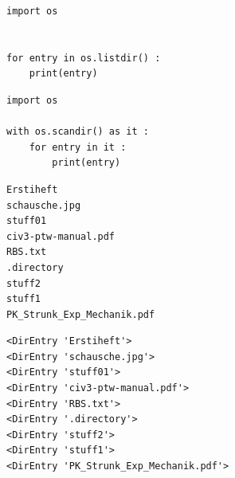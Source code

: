 \begin{frame}[fragile]
%
\begin{tcbraster}[raster columns=2,
                  raster equal height,
                  nobeforeafter,
                  raster column skip=0.5cm]
\begin{codebox}
\begin{verbatim}
import os


for entry in os.listdir() :
    print(entry)
\end{verbatim}
\end{codebox}
%
\begin{codebox}
\begin{verbatim}
import os

with os.scandir() as it :
    for entry in it :
        print(entry)
        \end{verbatim}
\end{codebox}
\end{tcbraster}
%
\begin{tcbraster}[raster columns=2,
                  raster equal height,
                  nobeforeafter,
                  raster column skip=0.5cm]
\begin{cmdbox}
\begin{verbatim}
Erstiheft
schausche.jpg
stuff01
civ3-ptw-manual.pdf
RBS.txt
.directory
stuff2
stuff1
PK_Strunk_Exp_Mechanik.pdf
\end{verbatim}
\end{cmdbox}
%
\begin{cmdbox}
\begin{verbatim}
<DirEntry 'Erstiheft'>
<DirEntry 'schausche.jpg'>
<DirEntry 'stuff01'>
<DirEntry 'civ3-ptw-manual.pdf'>
<DirEntry 'RBS.txt'>
<DirEntry '.directory'>
<DirEntry 'stuff2'>
<DirEntry 'stuff1'>
<DirEntry 'PK_Strunk_Exp_Mechanik.pdf'>
\end{verbatim}
\end{cmdbox}
\end{tcbraster}
%
\end{frame}


